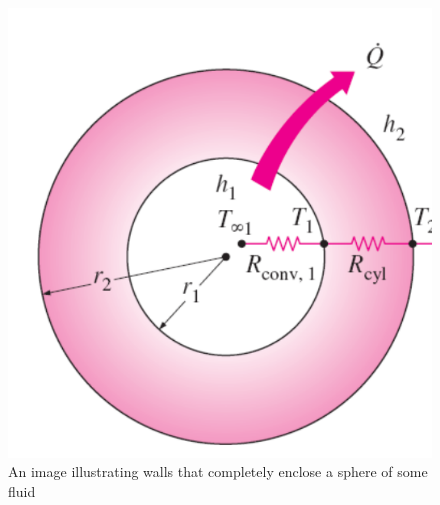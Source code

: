 \documentclass[•]{article}
\begin{document}
\begin{figure}[H]
\begin{center}
\includegraphics[scale=0.4]{SphericalWall.png}
\end{center}
\caption{An image illustrating walls that completely enclose a sphere of some fluid}
\end{figure}
\end{document}
